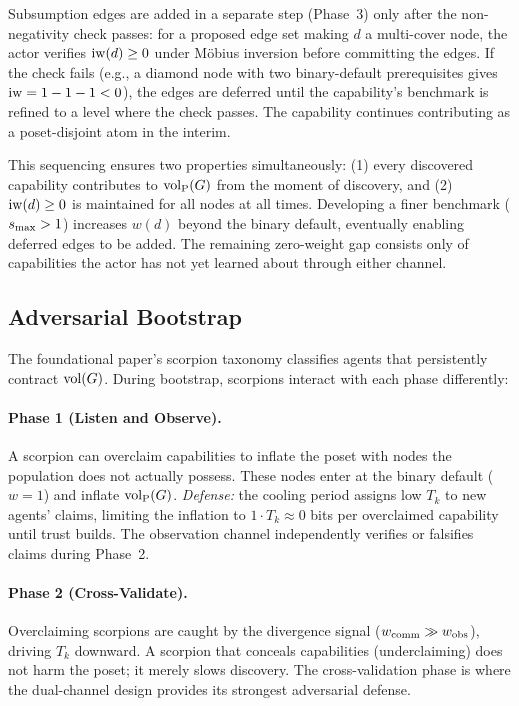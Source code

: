 Subsumption edges are added in a separate step (Phase~3) only after the
non-negativity check passes: for a proposed edge set making $d$ a multi-cover
node, the actor verifies $\operatorname{iw}(d) \geq 0$ under M\"{o}bius inversion before
committing the edges. If the check fails (e.g., a diamond node with two
binary-default prerequisites gives $\operatorname{iw} = 1 - 1 - 1 < 0$), the edges are
deferred until the capability's benchmark is refined to a level where the check
passes. The capability continues contributing as a poset-disjoint atom in the
interim.

This sequencing ensures two properties simultaneously: (1) every discovered
capability contributes to ${\operatorname{vol}_{\mathrm{P}}}(G)$ from the moment of discovery, and (2)
$\operatorname{iw}(d) \geq 0$ is maintained for all nodes at all times. Developing a finer
benchmark ($s_{\mathrm{max}} > 1$) increases $w(d)$ beyond the binary default, eventually
enabling deferred edges to be added. The remaining zero-weight gap consists
only of capabilities the actor has not yet learned about through either
channel.

\subsection{Adversarial Bootstrap}
\label{sec:adversarial_bootstrap}

The foundational paper's scorpion taxonomy \citep{lasser2026gfm} classifies
agents that persistently contract $\operatorname{vol}(G)$. During bootstrap, scorpions
interact with each phase differently:

\paragraph{Phase 1 (Listen and Observe).} A scorpion can overclaim
capabilities to inflate the poset with nodes the population does not
actually possess. These nodes enter at the binary default ($w = 1$) and
inflate ${\operatorname{vol}_{\mathrm{P}}}(G)$. \emph{Defense:} the cooling period assigns low $T_k$ to
new agents' claims, limiting the inflation to $1 \cdot T_k \approx 0$ bits
per overclaimed capability until trust builds. The observation channel
independently verifies or falsifies claims during Phase~2.

\paragraph{Phase 2 (Cross-Validate).} Overclaiming scorpions are caught by
the divergence signal ($w_{\mathrm{comm}} \gg w_{\mathrm{obs}}$), driving $T_k$ downward. A
scorpion that conceals capabilities (underclaiming) does not harm the poset;
it merely slows discovery. The cross-validation phase is where the
dual-channel design provides its strongest adversarial defense.

